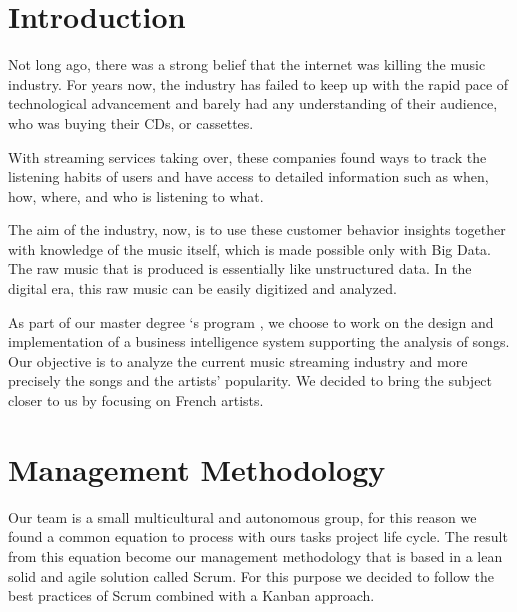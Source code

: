 \documentclass[12pt]{article}
\begin{document}

\tableofcontents
\pagebreak


\section{Introduction}
Not long ago, there was a strong belief that the internet was killing the music industry. For years now, the industry has failed to keep up with the rapid pace of technological advancement and  barely had any understanding of their audience, who was buying their CDs, or cassettes.\cite{Monnappa}

With streaming services taking over, these companies found ways to track the listening habits of users and have access to detailed information such as when, how, where, and who is listening to what.

The aim of the industry, now, is to use these customer behavior insights together with knowledge of the music itself, which is made possible only with Big Data. The raw music that is produced is essentially like unstructured data. In the digital era, this raw music can be easily digitized and analyzed.

As part of our master degree ‘s program , we choose to work on the design and implementation of a business intelligence system\cite{moss2003business} supporting the analysis of songs.
Our objective is to analyze the current music streaming industry and more precisely the songs and the artists' popularity. We decided to bring the subject closer to us by focusing on French artists.




\section{Management Methodology}

Our team is a small multicultural and autonomous group, for this reason we found a common equation to process with ours tasks project life cycle. The result from this equation become our management methodology that is based in a lean solid and agile solution called Scrum. For this purpose we decided to follow the best practices of Scrum combined with a Kanban approach.
\end{document}
